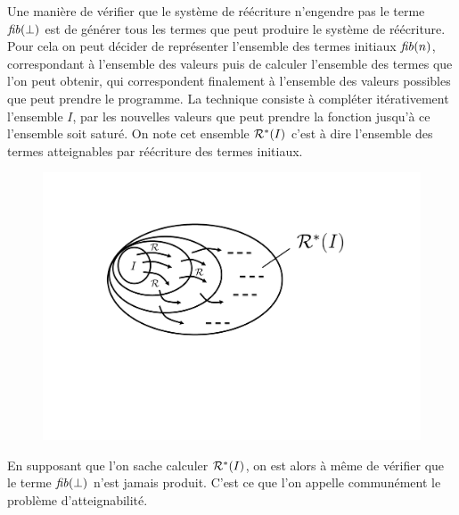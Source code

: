 Une manière de vérifier que le système de réécriture n'engendre pas le terme $\mathit{fib}(\perp)$ est de générer tous les 
termes que peut produire le système de réécriture. 
Pour cela on peut décider de représenter l'ensemble des termes initiaux $\mathit{fib}(n)$, correspondant à l'ensemble des valeurs 
puis de calculer l'ensemble des termes que l'on peut obtenir, qui correspondent finalement à l'ensemble des valeurs
possibles que peut prendre le programme. La technique consiste à compléter itérativement l'ensemble $I$, 
par les nouvelles valeurs que peut prendre la fonction jusqu'à ce l'ensemble soit saturé. On note cet ensemble $\mathcal R^*(I)$
c'est à dire l'ensemble des termes atteignables par réécriture des termes initiaux.

\begin{figure}[ht!]
  \centering
  \includegraphics[width=12cm]{1_intro/exact}
\end{figure}

En supposant que l'on sache calculer $\mathcal R^*(I)$, on est alors à même de vérifier que le terme $\mathit{fib}(\perp)$
n'est jamais produit. C'est ce que l'on appelle communément le problème d'atteignabilité.

